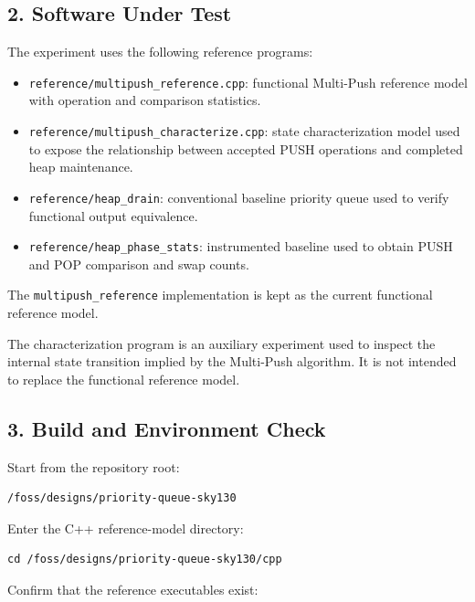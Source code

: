 \documentclass[11pt,a4paper]{article}
\begin{document}
\subsection{2. Software Under Test}

The experiment uses the following reference programs:

\begin{itemize}
\item \texttt{reference/multipush_reference.cpp}: functional
Multi-Push reference model with operation and comparison statistics.

\item \texttt{reference/multipush\_characterize.cpp}: state
characterization model used to expose the relationship between
accepted PUSH operations and completed heap maintenance.

\item \texttt{reference/heap\_drain}: conventional baseline priority
queue used to verify functional output equivalence.

\item \texttt{reference/heap\_phase\_stats}: instrumented baseline
used to obtain PUSH and POP comparison and swap counts.


\end{itemize}

The \texttt{multipush_reference} implementation is kept as the current
functional reference model.

The characterization program is an auxiliary experiment used to inspect
the internal state transition implied by the Multi-Push algorithm. It is
not intended to replace the functional reference model.

\subsection{3. Build and Environment Check}

Start from the repository root:

\begin{lstlisting}
/foss/designs/priority-queue-sky130
\end{lstlisting}

Enter the C++ reference-model directory:

\begin{lstlisting}
cd /foss/designs/priority-queue-sky130/cpp
\end{lstlisting}

Confirm that the reference executables exist:
\end{document}
